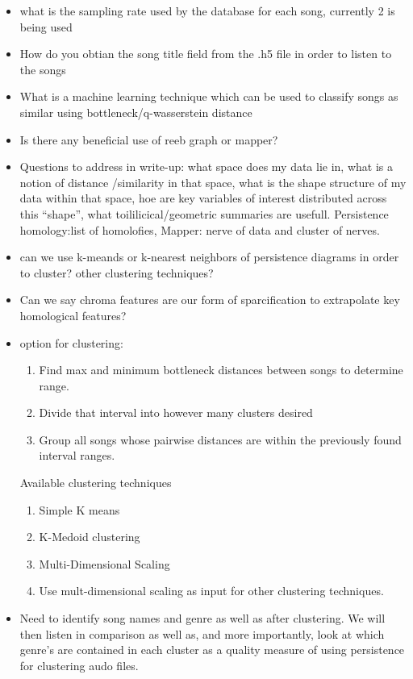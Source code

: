 \documentclass[11pt, a4paper]{article}
\begin{document}
  \begin{itemize}
  \item what is the sampling rate used by the database for each song, currently 2 is being used
  \item How do you obtian the song title field from the .h5 file in order to listen to the songs
  \item What is a machine learning technique which can be used to classify songs as similar using bottleneck/q-wasserstein distance
  \item Is there any beneficial use of reeb graph or mapper?
  \item Questions to address in write-up: what space does my data lie in, what is a notion of distance /similarity in that space, what is the shape structure of my data within that space, hoe are key variables of interest distributed across this ``shape'', what toililicical/geometric summaries are usefull. Persistence homology:list of homolofies, Mapper: nerve of data and cluster of nerves.
  \item can we use k-meands or k-nearest neighbors of persistence diagrams in order to cluster? other clustering techniques?
  \item Can we say chroma features are our form of sparcification to extrapolate key homological features?
  \item option for clustering:
    \begin{enumerate}
    \item Find max and minimum bottleneck distances between songs to determine range.
    \item Divide that interval into however many clusters desired
    \item Group all songs whose pairwise distances are within the previously found interval ranges.
    \end{enumerate}
    Available clustering techniques
    \begin{enumerate}
    \item Simple K means
    \item K-Medoid clustering
    \item Multi-Dimensional Scaling
    \item Use mult-dimensional scaling as input for other clustering techniques. 
    \end{enumerate}
  \item Need to identify song names and genre as well as after clustering. We will then listen in comparison as well as, and more importantly, look at which genre's are contained in each cluster as a quality measure of using persistence for clustering audo files.

\end{itemize}
\end{document}
